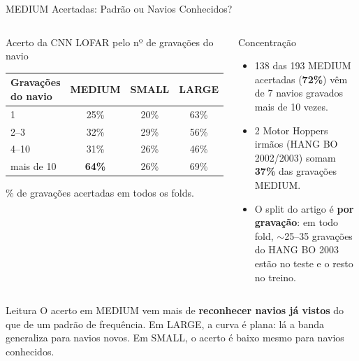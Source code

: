 \documentclass[aspectratio=169]{beamer}
\newcommand{\cahi}[1]{\cellcolor{green!30}\textbf{#1}}
\newcommand{\calo}[1]{\cellcolor{red!20}#1}
\begin{document}
\begin{frame}{MEDIUM Acertadas: Padrão ou Navios Conhecidos?}
    \footnotesize
    \begin{columns}[t]
        \begin{block}{\small Acerto da CNN LOFAR pelo nº de gravações do navio}
            \scriptsize
            \centering
            \begin{tabular}{lccc}
            \toprule
            Gravações do navio & MEDIUM & SMALL & LARGE \\
            \midrule
            1 & \calo{25\%} & 20\% & 63\% \\
            2--3 & 32\% & 29\% & 56\% \\
            4--10 & 31\% & 26\% & 46\% \\
            mais de 10 & \cahi{64\%} & 26\% & 69\% \\
            \bottomrule
            \end{tabular}

            \vspace{0.05cm}
            {\tiny \% de gravações acertadas em todos os folds.\par}
        \end{block}
        \begin{block}{\small Concentração}
            \scriptsize
            \begin{itemize}
                \setlength{\itemsep}{1pt}
                \item 138 das 193 MEDIUM acertadas (\textbf{72\%}) vêm de 7 navios gravados mais de 10 vezes.
                \item 2 Motor Hoppers irmãos (HANG BO 2002/2003) somam \textbf{37\%} das gravações MEDIUM.
                \item O split do artigo é \textbf{por gravação}: em todo fold, $\sim$25--35 gravações do HANG BO 2003 estão no teste e o resto no treino.
            \end{itemize}
        \end{block}
    \end{columns}
    \vspace{0.1cm}
    \begin{alertblock}{Leitura}
        \scriptsize
        O acerto em MEDIUM vem mais de \textbf{reconhecer navios já vistos} do que de um padrão de frequência. Em LARGE, a curva é plana: lá a banda generaliza para navios novos. Em SMALL, o acerto é baixo mesmo para navios conhecidos.
    \end{alertblock}
\end{frame}
\end{document}

